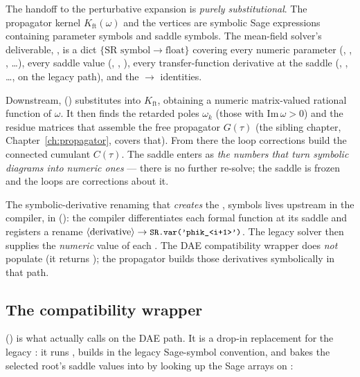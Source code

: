 The handoff to the perturbative expansion is \emph{purely substitutional}. The
propagator kernel $K_{\mathrm{ft}}(\omega)$ and the vertices are symbolic Sage
expressions containing parameter symbols and saddle symbols. The mean-field
solver's deliverable, , is a dict
$\{\text{SR symbol}\to\text{float}\}$ covering every numeric parameter (,
, , \dots), every saddle value (,
, ), every transfer-function derivative at the
saddle (, , \dots, on the legacy path), and the
 $\to$  identities.

Downstream, 
() substitutes  into
$K_{\mathrm{ft}}$, obtaining a numeric matrix-valued rational function of
$\omega$. It then finds the retarded poles $\omega_k$ (those with
$\mathrm{Im}\,\omega > 0$) and the residue matrices that assemble the free
propagator $G(\tau)$ (the sibling chapter, Chapter~\ref{ch:propagator}, covers
that). From there the loop corrections build the connected cumulant $C(\tau)$. The
saddle enters as \emph{the numbers that turn symbolic diagrams into numeric ones}
--- there is no further re-solve; the saddle is frozen and the loops are
corrections about it.

\begin{note}
The symbolic-derivative renaming that \emph{creates} the ,
 symbols lives upstream in the compiler, in
 (): the
compiler differentiates each formal function at its saddle and registers a rename
$\langle\text{derivative}\rangle \to \texttt{\small SR.var('phik\_<i+1>')}$. The legacy
solver then supplies the \emph{numeric} value of each . The DAE
compatibility wrapper does \emph{not} populate  (it returns
\code{\{\}}); the propagator builds those derivatives symbolically in that path.
\end{note}

\subsection{The compatibility wrapper}

 () is what
 actually calls on the DAE path. It is a drop-in replacement for
the legacy : it runs ,
builds  in the legacy Sage-symbol convention, and bakes the
selected root's saddle values into  by looking up the Sage
arrays on :

